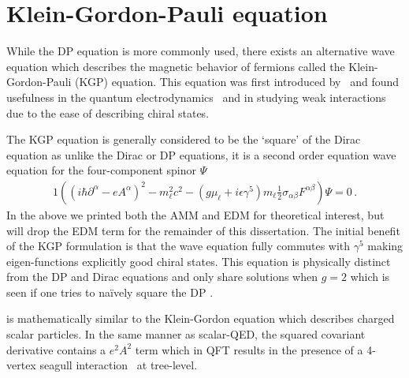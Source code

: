 \section{Klein-Gordon-Pauli equation}
\label{sec:kgp}
\noindent While the DP equation is more commonly used, there exists an alternative wave equation which describes the magnetic behavior of fermions called the Klein-Gordon-Pauli (KGP) equation. This equation was first introduced by~\cite{Fock:1937dy} and found usefulness in the quantum electrodynamics~\citep{Feynman:1951gn} and in studying weak interactions~\citep{Feynman:1958ty} due to the ease of describing chiral states.

The KGP equation is generally considered to be the `square' of the Dirac equation as unlike the Dirac or DP equations, it is a second order equation wave equation for the four-component spinor $\Psi$
\begin{alignat}{1}
	\label{kgp:1} \left((i\hbar\partial^{\alpha}-eA^{\alpha})^{2}-m_{\ell}^{2}c^{2}-\left(g\mu_{\ell}+i\epsilon\gamma^{5}\right)m_{\ell}\frac{1}{2}\sigma_{\alpha\beta}F^{\alpha\beta}\right)\Psi=0\,.
\end{alignat}
In the above we printed both the AMM and EDM for theoretical interest, but will drop the EDM term for the remainder of this dissertation. The initial benefit of the KGP formulation is that the wave equation fully commutes with $\gamma^{5}$ making eigen-functions explicitly good chiral states. This equation is physically distinct from the DP and Dirac equations and only share solutions when $g\!=\!2$ which is seen if one tries to na{\"i}vely square the DP .

 is mathematically similar to the Klein-Gordon equation which describes charged scalar particles. In the same manner as scalar-QED, the squared covariant derivative contains a $e^{2}A^{2}$ term which in QFT results in the presence of a 4-vertex seagull interaction~\citep{Schwartz:2014sze} at tree-level.

